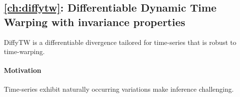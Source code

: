 





\newpage
\subsection*{\cref{ch:diffytw}: Differentiable Dynamic Time Warping with invariance properties}
DiffyTW is a differentiable divergence tailored for time-series that is robust to time-warping.

\paragraph{Motivation}
Time-series exhibit naturally occurring variations make inference challenging.

